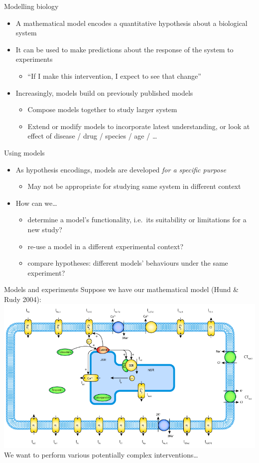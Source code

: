 \documentclass[t,xcolor={usenames,dvipsnames}]{beamer}
\newcommand{\subitem}[1]{\begin{itemize}[<.->]\item #1 \end{itemize}}
\begin{document}
\begin{frame}{Modelling biology}
\begin{itemize}[<+->]
\item A mathematical model encodes a quantitative hypothesis about a biological system
\item It can be used to make predictions about the response of the system to experiments
  \subitem{``If I make this intervention, I expect to see that change''}
\item Increasingly, models build on previously published models
  \begin{itemize}
  \item Compose models together to study larger system
  \item Extend or modify models to incorporate latest understanding, or look at effect of disease / drug / species / age / \ldots
  \end{itemize}
\end{itemize}
\end{frame}


\begin{frame}{Using models}
\begin{itemize}[<+->]
\item As hypothesis encodings, models are developed \emph{for a specific purpose}
  \subitem{May not be appropriate for studying same system in different context}
\item How can we\ldots
  \begin{itemize}
  \item determine a model's functionality, i.e.\ its suitability or limitations for a new study?
  \item re-use a model in a different experimental context?
  \item compare hypotheses: different models' behaviours under the same experiment?
  \end{itemize}
\end{itemize}
\end{frame}


\begin{frame}{Models and experiments}
\small
Suppose we have our mathematical model (Hund \& Rudy 2004):\\
\includegraphics[width=\textwidth]{hund_2004}\\
We want to perform various potentially complex interventions\ldots
\end{frame}
\end{document}
